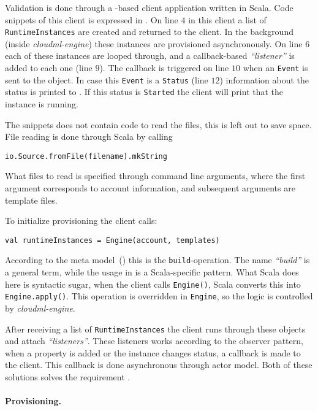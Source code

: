 Validation is done through a -based client application written in Scala.
Code snippets of this client is expressed in .
On line $4$ in this client a list of \texttt{RuntimeInstances} are created
and returned to the client.
In the background (inside \emph{cloudml-engine}) these instances are
provisioned asynchronously.
On line $6$ each of these instances are looped through, and a callback-based
\emph{``listener''} is added to each one (line $9$).
The callback is triggered on line $10$ when an \texttt{Event} is sent 
to the object.
In case this \texttt{Event} is a \texttt{Status} (line $12$) information
about the status is printed to .
If this status is \texttt{Started} the client will print that the instance is running.

The snippets does not contain code to read the files, this is left out to save space.
File reading is done through Scala by calling
\begin{verbatim}
io.Source.fromFile(filename).mkString
\end{verbatim}
What files to read is specified through command line arguments,
where the first argument corresponds to account information,
and subsequent arguments are template files.

To initialize provisioning the client calls:
\begin{verbatim}
val runtimeInstances = Engine(account, templates)
\end{verbatim}
According to the meta model~() this is the \texttt{build}-operation.
The name \emph{``build''} is a general term, while the usage in 
is a Scala-specific pattern.
What Scala does here is syntactic sugar, when the client calls \texttt{Engine()},
Scala converts this into \texttt{Engine.apply()}.
This operation is overridden in \texttt{Engine}, so the logic is controlled by \emph{cloudml-engine}.

After receiving a list of \texttt{RuntimeInstances} the client runs through these 
objects and attach \emph{``listeners''}.
These listeners works according to the observer pattern,
when a property is added or the instance changes status,
a callback is made to the client.
This callback is done asynchronous through actor model.
Both of these solutions solves the requirement .

\paragraph{Provisioning.}


